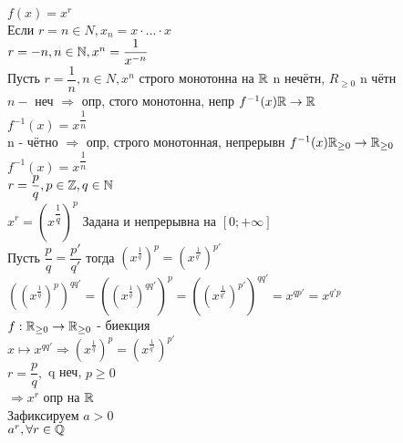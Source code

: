 
\begin{definition}
$ f(x) = x^r $\\
Если $ r = n \in N, x_n = x \cdot ... \cdot x $ \\
$ r = -n, n \in \mathbb{N}, x^n = \dfrac{ 1}{x^{-n}} $ \\
Пусть $ r = \dfrac{1}{n} , n \in N, x^n $ строго монотонна на $ \mathbb{R} $ n нечётн, $ R_{\geq 0} $ n чётн \\
$ n - $ неч $ \Rightarrow $ опр, стого монотонна, непр $ f^{-1} (x) \mathbb{R} \rightarrow \mathbb{R} $ \\
$ f^{-1} (x) = x^{\dfrac{1}{n}} $ \\
n - чётно $ \Rightarrow $ опр, строго монотонная, непрерывн $ f^{-1} (x) \mathbb{R}_{\geq 0} \rightarrow \mathbb{R}_{\geq 0} $ \\
$ f^{-1} (x) = x^{\dfrac{1}{n}} $ \\
$ r = \dfrac{p}{q}, p \in \mathbb{Z}, q \in \mathbb{N} $\\
$ x^r = (x^{\dfrac{1}{q}})^p $ Задана и непрерывна на $[0; +\infty] $\\
Пусть $ \dfrac{p}{q} = \dfrac{p'}{q'} $ тогда $ (x^{\frac{1}{q}})^p = (x^{\frac{1}{q'}})^{p'} $ \\
$ ((x^{\frac{1}{q}})^p)^{qq'} = ((x^{\frac{1}{q}})^{qq'})^p = ((x^{\frac{1}{q'}})^{p'})^{qq'} = x^{qp'} = x^{q'p}$ \\
$ f : \mathbb{R}_{\geq 0} \rightarrow \mathbb{R}_{\geq 0} $ - биекция \\
$ x \mapsto x^{qq'} \Rightarrow (x^{\frac{1}{q}})^p = (x^{\frac{1}{q'}})^{p'}$ \\
$ r = \dfrac{p}{q}, $ q неч,  $ p \geq 0 $ \\
$ \Rightarrow x^r $ опр на $ \mathbb{R} $ \\

Зафиксируем $ a > 0 $ \\
$ a^r, \forall r \in \mathbb{Q} $\\


\end{definition}
